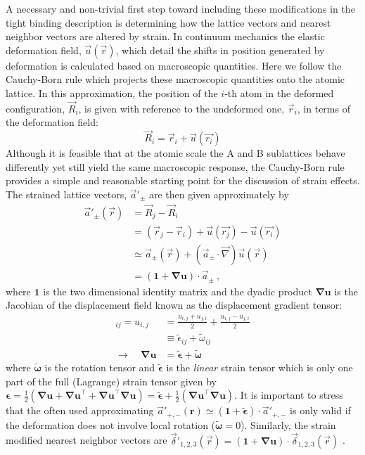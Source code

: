 A necessary and non-trivial first step toward including these modifications in the tight binding description is determining how the lattice vectors and nearest neighbor vectors are altered by strain.
In continuum mechanics the elastic deformation field, $\vec{u}(\vec{r})$, which detail the shifts in position generated by  deformation is calculated based on macroscopic quantities.
Here we follow the Cauchy-Born rule which projects these macroscopic quantities onto the atomic lattice.
In this approximation, the position of the $i$-th atom in the deformed configuration, $\vec{R}_i$, is given with reference to the undeformed one, $\vec{r}_i$, in terms of the deformation field:
\begin{equation*}
  \vec{R}_{i}=\vec{r}_{i}+\vec{u}(\vec{r_i})
\end{equation*}
Although it is feasible that at the atomic scale the A and B sublattices behave differently yet still yield the same macroscopic response, the Cauchy-Born rule provides a simple and reasonable starting point for the discussion of strain effects.
The strained lattice vectors, $\vec{a}'_{\pm}$ are then given approximately by
\begin{align*}
  \vec{a}'_{\pm}(\vec{r})&=\vec{R}_j-\vec{R}_i \\
                              &=(\vec{r}_j-\vec{r}_i)+\vec{u}(\vec{r_j})-\vec{u}(\vec{r_i}) \\
                              &\simeq\vec{a}_{\pm}(\vec{r})+(\vec{a}_{\pm} \cdot \vec{\nabla}) \vec{u}(\vec{r}) \\
                              &=(\bm{1}+\bm{\nabla u}) \cdot \vec{a}_{\pm} \ ,
\end{align*}
where $\bm{1}$ is the two dimensional identity matrix and the dyadic product $\bm{\nabla}\bm{u}$ is the Jacobian of the displacement field known as the displacement gradient tensor:
\begin{align*}
  [\bm{\nabla u}]_{ij} = u_{i,j} &= \frac{u_{i,j}+u_{j,i}}{2} + \frac{u_{i,j}-u_{j,i}}{2} \\
                       &\equiv \tilde{\epsilon}_{ij} + \tilde{\omega}_{ij} \\
    \rightarrow \quad \bm{\nabla u} &= \tilde{\bm{\epsilon}} + \tilde{\bm{\omega}}
\end{align*}
where $\tilde{\bm{\omega}}$ is the rotation tensor and $\tilde{\bm{\epsilon}}$ is the \emph{linear} strain tensor which is only one part of the full (Lagrange) strain tensor given by $\bm{\epsilon} = \tfrac{1}{2}(\bm{\nabla u} + \bm{\nabla u}^\top+\bm{\nabla u}^\top\bm{\nabla u}) = \tilde{\bm{\epsilon}} + \tfrac{1}{2}(\bm{\nabla u}^\top\bm{\nabla u})$.
It is important to stress that the often used approximating $\vec{a}'_{+,-}(\bm{r})\simeq (\bm{1}+\tilde{\bm{\epsilon}})\cdot \vec{a}'_{+,-}$ is only valid if the deformation does not involve local rotation ($\tilde{\bm{\omega}}=0$).
Similarly, the strain modified nearest neighbor vectors are $\vec{\delta}'_{1,2,3}(\vec{r})=(\bm{1}+\bm{\nabla u}) \cdot \vec{\delta}_{1,2,3}(\vec{r})$ \cite{Kitt2013}.

